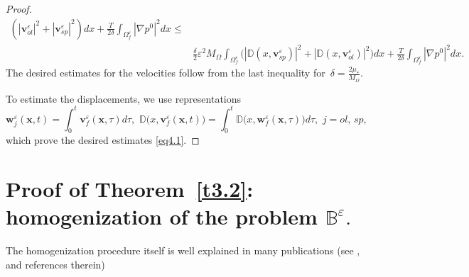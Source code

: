 \documentclass{article}
\theoremstyle{plain}
\theoremstyle{definition}
\numberwithin{equation}{section}
\begin{document}
\begin{proof}
\begin{equation}
\begin{aligned}
(|\boldsymbol{v}^{\varepsilon}_{ol}|^{2}+|\boldsymbol{v}^{\varepsilon}_{sp}|^{2})dx+
\frac{T}{2\delta}\int_{\Omega^{\varepsilon}_{f}}|\nabla{p}^{0}|^{2}dx\leqslant
\\
& \frac{\delta}{2}\varepsilon^{2}{M}_{\Omega}\int_{\Omega^{\varepsilon}_{f}}
\big(|\mathbb{D}(x,\boldsymbol{v}^{\varepsilon}_{sp})|^{2}+
|\mathbb{D}(x,\boldsymbol{v}^{\varepsilon}_{ol})|^{2}\big)dx+
\frac{T}{2\delta}\int_{\Omega^{\varepsilon}_{f}}|\nabla{p}^{0}|^{2}dx.
\end{aligned}
\end{equation}
The desired estimates for the velocities follow from the last inequality for
$\displaystyle\,\delta=\frac{2\mu_{*}}{{M}_{\Omega}}$.

To estimate the displacements, we use representations
\begin{equation*}
\boldsymbol{w}^{\varepsilon}_{j}(\boldsymbol{x},t)=
\int_{0}^{t}\boldsymbol{v}^{\varepsilon}_{f}(\boldsymbol{x},\tau)d\tau,\,\,
\mathbb{D}\big(x,\boldsymbol{v}^{\varepsilon}_{f}(\boldsymbol{x},t)\big)=
\int_{0}^{t}\mathbb{D}\big(x,\boldsymbol{w}^{\varepsilon}_{f}(\boldsymbol{x},\tau)\big)d\tau,\,\,j=ol,\,sp,
\end{equation*}
which prove the desired estimates \eqref{eq4.1}.
\end{proof}

\section{Proof of Theorem~\ref{t3.2}: homogenization of the problem $\mathbb{B}^{\varepsilon}.$}
\label{sec5}

The homogenization procedure itself is well explained in many publications (see \cite{6}, \cite{22} and references therein)
\end{document}
